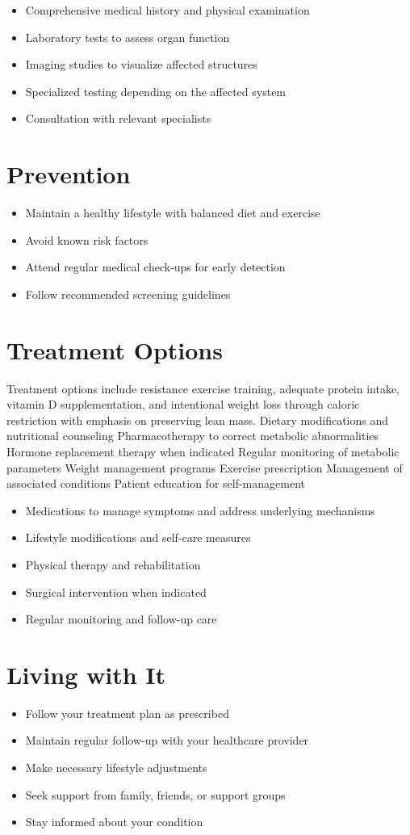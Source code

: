 \begin{itemize}[noitemsep]
  \item Comprehensive medical history and physical examination
  \item Laboratory tests to assess organ function
  \item Imaging studies to visualize affected structures
  \item Specialized testing depending on the affected system
  \item Consultation with relevant specialists
\end{itemize}
\section{Prevention}
\begin{itemize}[noitemsep]
  \item Maintain a healthy lifestyle with balanced diet and exercise
  \item Avoid known risk factors
  \item Attend regular medical check-ups for early detection
  \item Follow recommended screening guidelines
\end{itemize}
\section{Treatment Options}
Treatment options include resistance exercise training, adequate protein intake, vitamin D supplementation, and intentional weight loss through caloric restriction with emphasis on preserving lean mass. Dietary modifications and nutritional counseling Pharmacotherapy to correct metabolic abnormalities Hormone replacement therapy when indicated Regular monitoring of metabolic parameters Weight management programs Exercise prescription Management of associated conditions Patient education for self-management

\begin{itemize}[noitemsep]
  \item Medications to manage symptoms and address underlying mechanisms
  \item Lifestyle modifications and self-care measures
  \item Physical therapy and rehabilitation
  \item Surgical intervention when indicated
  \item Regular monitoring and follow-up care
\end{itemize}
\section{Living with It}
\begin{itemize}[noitemsep]
  \item Follow your treatment plan as prescribed
  \item Maintain regular follow-up with your healthcare provider
  \item Make necessary lifestyle adjustments
  \item Seek support from family, friends, or support groups
  \item Stay informed about your condition
\end{itemize}
